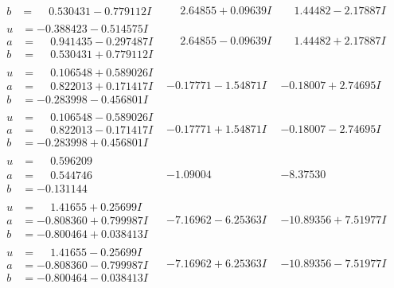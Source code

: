 \documentclass[1p]{elsarticle_modified}
\theoremstyle{definition}
\begin{document}
$$\begin{array}{c|c|c}
\begin{aligned}
b &= \phantom{-}0.530431 - 0.779112 I\end{aligned}
 & \phantom{-}2.64855 + 0.09639 I & \phantom{-}1.44482 - 2.17887 I \\ \hline\begin{aligned}
u &= -0.388423 - 0.514575 I \\
a &= \phantom{-}0.941435 - 0.297487 I \\
b &= \phantom{-}0.530431 + 0.779112 I\end{aligned}
 & \phantom{-}2.64855 - 0.09639 I & \phantom{-}1.44482 + 2.17887 I \\ \hline\begin{aligned}
u &= \phantom{-}0.106548 + 0.589026 I \\
a &= \phantom{-}0.822013 + 0.171417 I \\
b &= -0.283998 - 0.456801 I\end{aligned}
 & -0.17771 - 1.54871 I & -0.18007 + 2.74695 I \\ \hline\begin{aligned}
u &= \phantom{-}0.106548 - 0.589026 I \\
a &= \phantom{-}0.822013 - 0.171417 I \\
b &= -0.283998 + 0.456801 I\end{aligned}
 & -0.17771 + 1.54871 I & -0.18007 - 2.74695 I \\ \hline\begin{aligned}
u &= \phantom{-}0.596209\phantom{ +0.000000I} \\
a &= \phantom{-}0.544746\phantom{ +0.000000I} \\
b &= -0.131144\phantom{ +0.000000I}\end{aligned}
 & -1.09004\phantom{ +0.000000I} & -8.37530\phantom{ +0.000000I} \\ \hline\begin{aligned}
u &= \phantom{-}1.41655 + 0.25699 I \\
a &= -0.808360 + 0.799987 I \\
b &= -0.800464 + 0.038413 I\end{aligned}
 & -7.16962 - 6.25363 I & -10.89356 + 7.51977 I \\ \hline\begin{aligned}
u &= \phantom{-}1.41655 - 0.25699 I \\
a &= -0.808360 - 0.799987 I \\
b &= -0.800464 - 0.038413 I\end{aligned}
 & -7.16962 + 6.25363 I & -10.89356 - 7.51977 I \\ \hline\begin{aligned}

\end{aligned}
\end{array}$$
\end{document}
